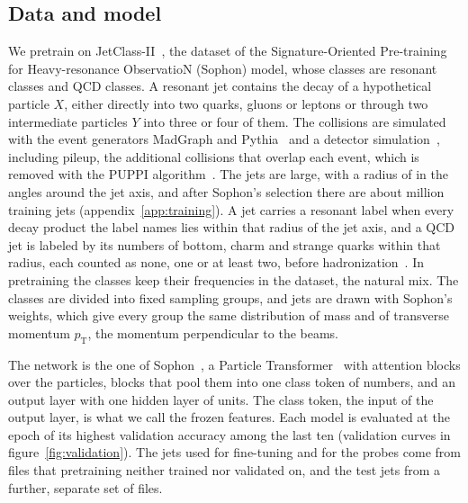 \subsection{Data and model}
We pretrain on JetClass-II~\cite{sophon,jetclasstwo}, the dataset of the Signature-Oriented Pre-training for
Heavy-resonance ObservatioN (Sophon) model, whose \Kfull{} classes are \LitJetClassTwoNResonantClasses{}
resonant classes and \LitJetClassTwoNQcdClasses{} QCD classes.
A resonant jet contains the decay of a hypothetical particle $X$, either directly into two quarks, gluons or
leptons or through two intermediate particles $Y$ into three or four of them.
The collisions are simulated with the event generators MadGraph and Pythia~\cite{madgraph,pythia} and a detector
simulation~\cite{delphes}, including pileup, the additional collisions that overlap each event, which is removed with
the PUPPI algorithm~\cite{puppi,cmspu}.
The jets are large, with a radius of \LitJetClassTwoJetRadius{} in the angles around the jet axis, and after Sophon's
selection there are about \VNTrainMillion{} million training jets (appendix~\ref{app:training}).
A jet carries a resonant label when every decay product the label names lies within that radius of the jet axis, and
a QCD jet is labeled by its numbers of bottom, charm and strange quarks within that radius, each counted as none, one or
at least two, before hadronization~\cite[App.~A]{sophon}.
In pretraining the classes keep their frequencies in the dataset, the natural mix.
The classes are divided into fixed sampling groups, and jets are drawn with Sophon's weights, which give every group
the same distribution of mass and of transverse momentum $p_{\mathrm T}$, the momentum perpendicular to the beams.

The network is the one of Sophon~\cite{sophon}, a Particle Transformer~\cite{part} with \DesignParticleBlocks{} attention
blocks over the particles, \DesignClassBlocks{} blocks that pool them into one class token of
\DesignEmbedDim{} numbers, and an output layer with one hidden layer of \DesignHeadHidden{} units.
The class token, the input of the output layer, is what we call the frozen features.
Each model is evaluated at the epoch of its highest validation accuracy among the last ten (validation curves in
figure~\ref{fig:validation}).
The jets used for fine-tuning and for the probes come from files that pretraining neither trained nor validated on,
and the test jets from a further, separate set of files.

